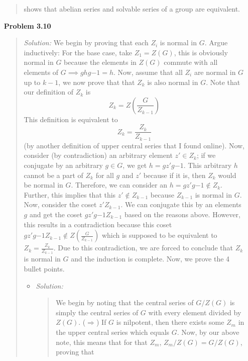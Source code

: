 \documentclass{article}
\newcommand{\Solution}{\textit{Solution: }}
\begin{document}
\begin{enumerate}
\begin{quote}
            shows that abelian series and solvable series of a group are equivalent. \qedsymbol
        \end{quote}
        \item[\textbf{Problem 3.10}]
        \begin{quote}
            \Solution We begin by proving that each $Z_i$ is normal in $G$. Argue inductively: For the base case, take $Z_1 = Z(G)$, this is obviously normal in $G$ because the elements in $Z(G)$ commute 
            with all elements of $G \implies ghg{-1} = h$. Now, assume that all $Z_i$ are normal in $G$ up to $k - 1$, we now prove that that $Z_k$ is also normal in $G$. Note that our definition of $Z_k$ is 
            \begin{equation*}
                Z_k = Z(\frac{G}{Z_{k - 1}})
            \end{equation*} This definition is equivalent to 
            \begin{equation*}
                Z_k = \frac{Z_k}{Z_{k - 1}}
            \end{equation*} (by another definition of upper central series that I found online). Now, consider (by contradiction) an arbitrary element $z' \in Z_k$; if we conjugate by an arbitrary $g \in G$, we get $h = gz'g{-1}$.
            This arbitrary $h$ cannot be a part of $Z_{k}$ for all $g$ and $z'$ because if it is, then $Z_k$ would be normal in $G$. Therefore, we can consider an $h = gz'g{-1} \notin Z_{k}$. Further, this
            implies that this $z' \notin Z_{k-1}$ because $Z_{k-1}$ is normal in $G$. Now, consider the coset $z'Z_{k-1}$. We can conjugate this by an elements $g$ and get the coset $gz'g{-1}Z_{k-1}$ based on the
            reasons above. However, this results in a contradiction because this coset $gz'g{-1}Z_{k-1} \notin Z(\frac{G}{Z_{k - 1}})$ which is supposed to be equivalent to $Z_k = \frac{Z_k}{Z_{k - 1}}$. Due to this
            contradiction, we are forced to conclude that $Z_k$ is normal in $G$ and the induction is complete.
            Now, we prove the 4 bullet points.
\newpage
            \begin{itemize}
                \item \Solution
                \begin{quote} 
                    We begin by noting that the central series of $G/Z(G)$ is simply the central series of $G$ with every element divided by $Z(G)$.
                    ($\Rightarrow$) If $G$ is nilpotent, then there exists some $Z_m$ in the upper central series which equals $G$. Now, by our above note, this means that for that $Z_m$, $Z_m/Z(G) = G/Z(G)$, proving that 

\end{quote}
\end{itemize}
\end{quote}
\end{enumerate}
\end{document}
